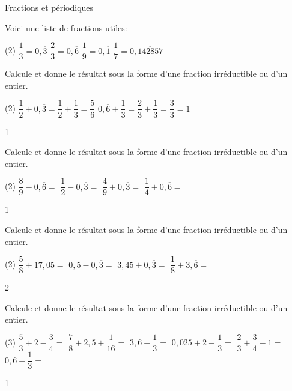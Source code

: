 \documentclass[a4paper,11pt]{report}
\begin{document}
\begin{resolu}{Fractions et périodiques}{Voici une liste de fractions utiles:
		\begin{tasks}(2)
    \task $\dfrac{1}{3}=0,\overline{3} $
    \task $\dfrac{2}{3}=0,\overline{6} $
    \task $\dfrac{1}{9}=0,\overline{1}$
    \task $\dfrac{1}{7}=0,\overline{142857}$
\end{tasks}

Calcule et donne le résultat sous la forme d'une fraction irréductible ou d'un entier. 

\begin{tasks}(2)
    \task $\dfrac{1}{2}+0,\overline{3}=\dfrac{1}{2}+ \dfrac{1}{3}=\dfrac{5}{6}$
   \task $0,\overline{6}+\dfrac{1}{3}=\dfrac{2}{3}+\dfrac{1}{3}=\dfrac{3}{3}=1$
\end{tasks}}
{1}
\end{resolu}

\vfill

\begin{exo}
{Calcule et donne le résultat sous la forme d'une fraction irréductible ou d'un entier.

	\begin{tasks}(2)
\task $\dfrac{8}{9}-0,\overline{6}=$
\task$\dfrac{1}{2}-0,\overline{3}=$
\task $\dfrac{4}{9}+0,\overline{3}=$
\task $\dfrac{1}{4}+0,\overline{6}=$
\end{tasks}}
{1}
\end{exo}

\vfill

\begin{exo}
 {Calcule et donne le résultat sous la forme d'une fraction irréductible ou d'un entier.

	 \begin{tasks}(2)
\task $\dfrac{5}{8}+17,05=$
\task$0,5-0,\overline{3}=$
\task $ 3,45+0,\overline{3}=$
\task $\dfrac{1}{8}+3,\overline{6}=$
\end{tasks}
}
{2}
\end{exo}


\vfill

\newpage


\vfill

\begin{exo}
 {Calcule et donne le résultat sous la forme d'une fraction irréductible ou d'un entier.
\begin{tasks}(3)
 \task  $\dfrac{5}{3}+2-\dfrac{3}{4}=$
 \task  $\dfrac{7}{8}+2,5+\dfrac{1}{16}=$
 \task $3,6-\dfrac{1}{3}=$
 \task  $0,025+2-\dfrac{1}{3}=$
 \task  $\dfrac{2}{3}+\dfrac{3}{4}-1=$
 \task $0,6-\dfrac{1}{3}=$
\end{tasks}
}{1}
\end{exo}
\end{document}
